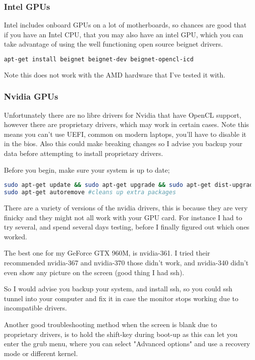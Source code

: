 \documentclass[12pt]{article}
\begin{document}
\subsubsection{Intel GPUs}
Intel includes onboard GPUs on a lot of motherboards, 
so chances are good that if you have an Intel CPU, that you may also have an
intel GPU, which you can take advantage of using the well functioning open
source beignet drivers.

\begin{lstlisting}[language=bash]
apt-get install beignet beignet-dev beignet-opencl-icd
\end{lstlisting}

Note this does not work with the AMD hardware that I've tested it with.

\subsubsection{Nvidia GPUs}
Unfortunately there are no libre drivers for Nvidia that have OpenCL support,
however there are proprietary drivers, which may work in certain cases. 
Note this means you can't use UEFI, common on modern laptops, you'll have to
disable it in the bios.  Also this could make breaking changes so I advise you
backup your data before attempting to install proprietary drivers. 

Before you begin, make sure your system is up to date;
\begin{lstlisting}[language=bash]
sudo apt-get update && sudo apt-get upgrade && sudo apt-get dist-upgrade;
sudo apt-get autoremove #cleans up extra packages
\end{lstlisting}

There are a variety of versions of the nvidia drivers, this is because they are
very finicky and they might not all work with your GPU card.  For instance I had
to try several, and spend several days testing, before I finally figured out
which ones worked. 

The best one for my GeForce GTX 960M, is nvidia-361. I tried their recommended
nvidia-367 and nvidia-370 those didn't work, and nvidia-340 didn't even show any
picture on the screen (good thing I had ssh). 

So I would advise you backup your system, and install ssh, so you could ssh
tunnel into your computer and fix it in case the monitor stops working due to
incompatible drivers. 

Another good troubleshooting method when the screen is blank due to proprietary
drivers, is to hold the shift-key during boot-up as this can let you enter the
grub menu, where you can select "Advanced options" and use a recovery mode or
different kernel. 
\end{document}

